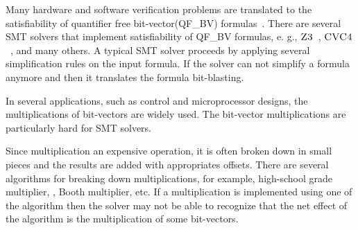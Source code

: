 %
Many hardware and software verification problems are translated to the
satisfiability of quantifier free bit-vector(QF\_BV)
formulas~\cite{hardware,cbmc,more}.
%
There are several SMT solvers that implement satisfiability of 
QF\_BV formulas, e. g., $\textsc{Z3}$~\cite{z3}, $\textsc{CVC4}$~\cite{cvc4}, 
and many others.
%
A typical SMT solver proceeds by applying several simplification rules
on the input formula.
%
If the solver can not simplify a formula anymore and then it
translates the formula bit-blasting.

%
In several applications, such as control and microprocessor designs,
the multiplications of bit-vectors are widely used.
%
The bit-vector multiplications are particularly hard for SMT solvers.
%

%
Since multiplication an expensive operation, it is often broken down
in small pieces and the results are added with appropriates offsets.
%
There are several algorithms for breaking down multiplications, for
example, high-school grade multiplier, , Booth
multiplier, etc.
%
If a multiplication is implemented using one of the algorithm then the
solver may not be able to recognize that the net effect of the
algorithm is the multiplication of some bit-vectors.
%
 













